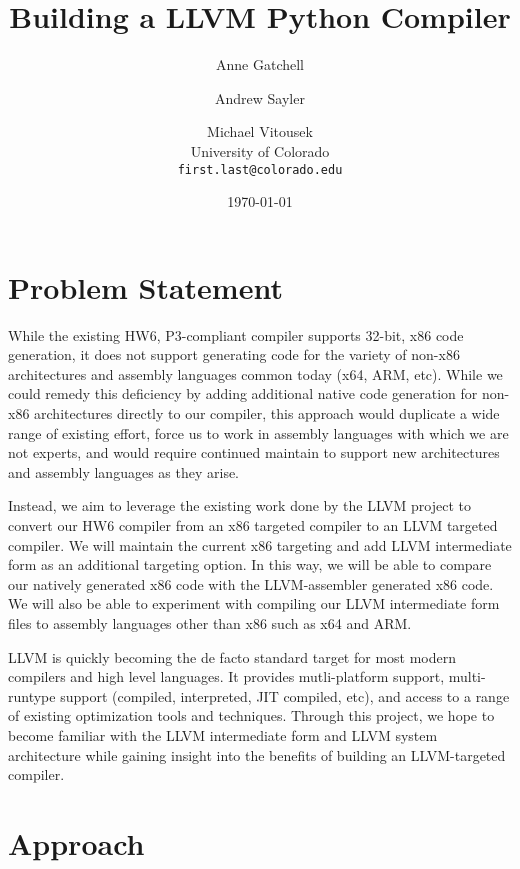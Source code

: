 \documentclass[11pt]{article}
\begin{document}
\title{
  Building a LLVM Python Compiler
}

\author{
  Anne Gatchell \and Andrew Sayler \and Michael Vitousek\\
  University of Colorado\\
  \texttt{first.last@colorado.edu}
}

\date{\today}

\maketitle

\newpage

\section{Problem Statement}

While the existing HW6, P3-compliant compiler supports 32-bit,
x86 code generation, it does not support generating code for the variety
of non-x86 architectures and assembly languages common today (x64, ARM,
etc). While we could remedy
this deficiency by adding additional native code generation for non-x86
architectures directly to our compiler, this approach would duplicate a
wide range of existing effort, force us to work in assembly languages
with which we are not experts, and would require continued maintain to
support new architectures and assembly languages as they arise.

Instead, we aim to leverage the existing work done by the LLVM project to
convert our HW6 compiler from an x86 targeted compiler to
an LLVM targeted compiler. We will maintain the current x86 targeting
and add LLVM intermediate form as an additional targeting option. In
this way, we will be able to compare our natively generated x86 code
with the LLVM-assembler generated x86 code. We will also be able to
experiment with compiling our LLVM intermediate form files to assembly
languages other than x86 such as x64 and ARM.

LLVM is quickly becoming the de facto standard target for most modern
compilers and high level languages.
It provides mutli-platform support, multi-runtype support
(compiled, interpreted, JIT compiled, etc), and access to a
range of existing optimization tools and techniques. Through this
project, we hope to become
familiar with the LLVM intermediate form and LLVM system architecture
while gaining insight into the benefits of building an LLVM-targeted
compiler. 

\section{Approach}
\end{document}
